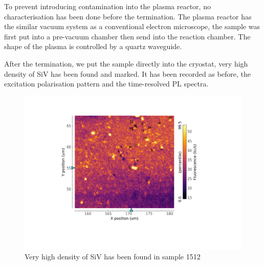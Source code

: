 To prevent introducing contamination into the plasma reactor, no characterisation has been done before the termination. The plasma reactor has the similar vacuum system as a conventional electron microscope, the sample was first put into a pre-vacuum chamber then send into the reaction chamber. The shape of the plasma is controlled by a quartz waveguide. 

After the termination, we put the sample directly into the cryostat, very high density of SiV has been found and marked. It has been recorded as before, the excitation polarisation pattern and the time-resolved PL spectra.
\begin{figure}[h]
\centering
\includegraphics[width=0.7\linewidth]{Figures/pic/hmap}
\caption{Very high density of SiV has been found in sample 1512}
\label{fig:hmap}
\end{figure}

